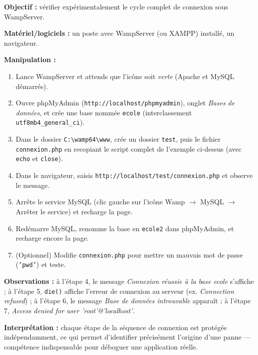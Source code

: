 \documentclass[11pt]{article}
\begin{document}
\begin{experience}
\textbf{Objectif :} vérifier expérimentalement le cycle complet de connexion sous WampServer.

\textbf{Matériel/logiciels :} un poste avec WampServer (ou XAMPP) installé, un navigateur.

\textbf{Manipulation :}
\begin{enumerate}
  \item Lance WampServer et attends que l'icône soit \emph{verte} (Apache et MySQL démarrés).
  \item Ouvre phpMyAdmin (\texttt{http://localhost/phpmyadmin}), onglet \emph{Bases de données}, et crée une base nommée \texttt{ecole} (interclassement \texttt{utf8mb4\_general\_ci}).
  \item Dans le dossier \texttt{C:\textbackslash wamp64\textbackslash www}, crée un dossier \texttt{test}, puis le fichier \texttt{connexion.php} en recopiant le script complet de l'exemple ci-dessus (avec \texttt{echo} et \texttt{close}).
  \item Dans le navigateur, saisis \texttt{http://localhost/test/connexion.php} et observe le message.
  \item Arrête le service MySQL (clic gauche sur l'icône Wamp $\rightarrow$ MySQL $\rightarrow$ Arrêter le service) et recharge la page.
  \item Redémarre MySQL, renomme la base en \texttt{ecole2} dans phpMyAdmin, et recharge encore la page.
  \item (Optionnel) Modifie \texttt{connexion.php} pour mettre un mauvais mot de passe (\texttt{'pwd'}) et teste.
\end{enumerate}
\textbf{Observations :} à l'étape 4, le message \emph{Connexion réussie à la base ecole} s'affiche ; à l'étape 5, \texttt{die()} affiche l'erreur de connexion au serveur (ex. \emph{Connection refused}) ; à l'étape 6, le message \emph{Base de données introuvable} apparaît ; à l'étape 7, \emph{Access denied for user 'root'@'localhost'}.

\textbf{Interprétation :} chaque étape de la séquence de connexion est protégée indépendamment, ce qui permet d'identifier précisément l'origine d'une panne — compétence indispensable pour déboguer une application réelle.
\end{experience}
\end{document}
